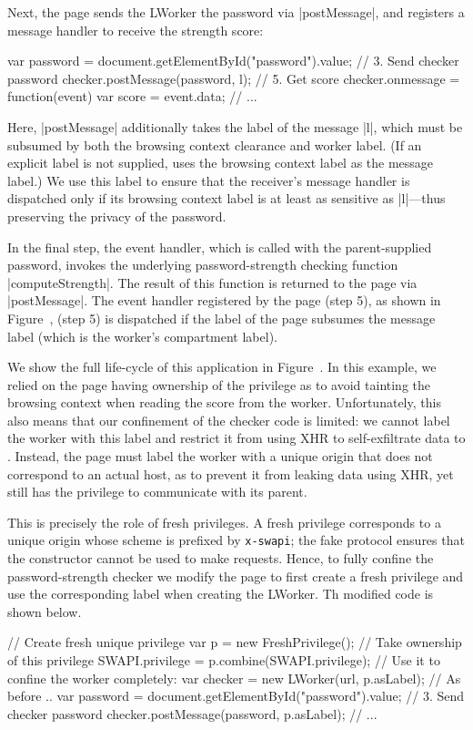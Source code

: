 Next, the page sends the LWorker the
password via \js|postMessage|, and registers a message handler to
receive the strength score:
\begin{jscode}
var password = 
 document.getElementById("password").value;
// 3. Send checker password 
checker.postMessage(password, l);
// 5. Get score
checker.onmessage = function(event) {
  var score = event.data; 
  // ...
}
\end{jscode}
Here, \js|postMessage| additionally takes the label of the message
\js|l|, which must be subsumed by both the browsing context clearance
and worker label.
%
(If an explicit label is not supplied, \sys{} uses the browsing
context label as the message label.)
%
We use this label to ensure that the receiver's message handler is
dispatched only if its browsing context label is at least as sensitive
as \js|l|---thus preserving the privacy of the password.

In the final step, the event handler, which is called with the
parent-supplied password, invokes the underlying password-strength
checking function \js|computeStrength|.
%
The result of this function is returned to the page via
\js|postMessage|.
%
The event handler registered by the page 
\iffigures
\ifcompletefigures
(step 5), as shown in Figure~, 
\else
(step 5)
\fi
\fi
is dispatched if the label of
the page subsumes the message label (which is the worker's compartment
label).

\iffigures
\ifcompletefigures
We show the full life-cycle of this application in
Figure~.
\fi
\fi
%
In this example, we relied on the page having ownership of the
 privilege as to avoid tainting the browsing
context when reading the score from the worker.
%
Unfortunately, this also means that our confinement of the checker
code is limited: we cannot label the worker with this label and
restrict it from using XHR to self-exfiltrate data to
.
%
Instead, the page must label the worker with a unique origin that does
not correspond to an actual host, as to prevent it from leaking data
using XHR, yet still has the privilege to communicate with its parent.

This is precisely the role of fresh privileges.
%
A fresh privilege corresponds to a unique origin whose scheme is
prefixed by \texttt{x-swapi}; the fake protocol ensures that the
\xhr{} constructor cannot be used to make requests.
%
Hence, to fully confine the password-strength checker we modify the
 page to first create a fresh privilege and use the
corresponding label when creating the LWorker.
%
Th modified code is shown below.
\begin{jscode}
// Create fresh unique privilege
var p = new FreshPrivilege();
// Take ownership of this privilege
SWAPI.privilege = p.combine(SWAPI.privilege);
// Use it to confine the worker completely:
var checker = new LWorker(url, p.asLabel);
// As before ..
var password = 
 document.getElementById("password").value;
// 3. Send checker password 
checker.postMessage(password, p.asLabel);
// ...
\end{jscode}

